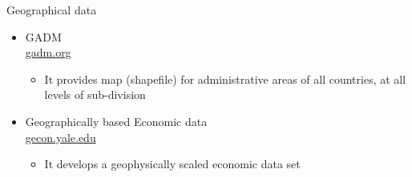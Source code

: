 \documentclass[hyperref={pdfpagelabels=false}]{beamer}
\begin{document}
\begin{frame}{Geographical data}
\begin{itemize} 
\item GADM \\ \href{https://gadm.org/index.html}{gadm.org}  
\vspace{0.2cm}
\begin{itemize} 
\vspace{0.2cm}
\item It provides map (shapefile) for administrative areas of all countries, at all levels of sub-division
\end{itemize}
\vspace{0.2cm}
\item Geographically based Economic data \\ \href{https://gecon.yale.edu/g-econ-project-yale-university-september-2009}{gecon.yale.edu}  
\vspace{0.2cm}
\begin{itemize} 
\vspace{0.2cm}
\item It develops a geophysically scaled economic data set
\end{itemize}


\end{itemize}
\end{frame}
\end{document}
